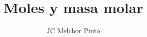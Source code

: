 \documentclass[12pt,addpoints]{guia}
\title{Moles y masa molar}
\author{JC Melchor Pinto}
\begin{document}
\INFO%
\begin{multicols}{2}
        
        
\end{multicols}\vspace*{-0.5cm}


\begin{questions}
        \questionboxed[10]{}
        \begin{multicols}{2}
        \ejemplosboxed[]
        \questionboxed[10]{}
        \questionboxed[10]{}
        \questionboxed[10]{}
        \ejemplosboxed[]
        \questionboxed[10]{}
        \questionboxed[10]{}
        \questionboxed[10]{}
        \end{multicols}
        \questionboxed[15]{}
        \questionboxed[15]{}
\end{questions}
\end{document}
